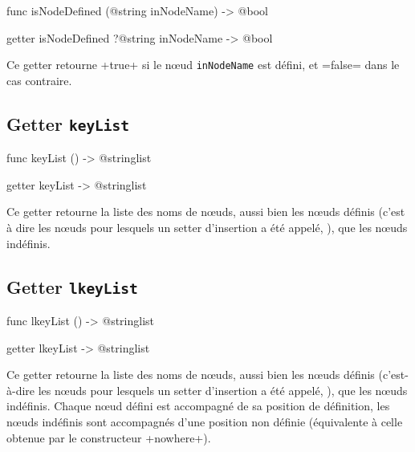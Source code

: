 \begin{galgas4}
func isNodeDefined (@string inNodeName) -> @bool
\end{galgas4}

\begin{galgas4}
getter isNodeDefined ?@string inNodeName -> @bool
\end{galgas4}

Ce getter retourne \ggsq+true+ si le nœud \texttt{inNodeName} est défini, et \ggsq=false= dans le cas contraire.


\subsection{Getter \texttt{keyList}}

\begin{galgas4}
func keyList () -> @stringlist
\end{galgas4}

\begin{galgas4}
getter keyList -> @stringlist
\end{galgas4}

Ce getter retourne la liste des noms de nœuds, aussi bien les nœuds définis (c'est à dire les nœuds pour lesquels un setter d'insertion a été appelé, ), que les nœuds indéfinis.



\subsection{Getter \texttt{lkeyList}}

\begin{galgas4}
func lkeyList () -> @stringlist
\end{galgas4}

\begin{galgas4}
getter lkeyList -> @stringlist
\end{galgas4}

Ce getter retourne la liste des noms de nœuds, aussi bien les nœuds définis (c'est-à-dire les nœuds pour lesquels un setter d'insertion a été appelé, ), que les nœuds indéfinis. Chaque nœud défini est accompagné de sa position de définition, les nœuds indéfinis sont accompagnés d'une position non définie (équivalente à celle obtenue par le constructeur \ggsq+nowhere+).






